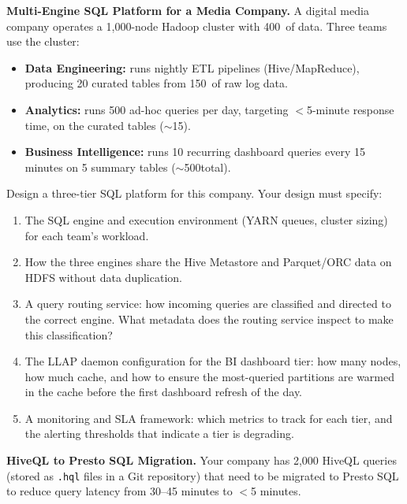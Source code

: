\bigskip
{}

\dpr \textbf{Multi-Engine SQL Platform for a Media Company.}
A digital media company operates a 1{,}000-node Hadoop cluster with
400\TB\ of data. Three teams use the cluster:
\begin{itemize}
  \item \textbf{Data Engineering:} runs nightly ETL pipelines (Hive/MapReduce),
        producing 20 curated tables from 150\TB\ of raw log data.
  \item \textbf{Analytics:} runs 500 ad-hoc queries per day, targeting
        $<$5-minute response time, on the curated tables ($\sim$15\TB).
  \item \textbf{Business Intelligence:} runs 10 recurring dashboard queries
        every 15 minutes on 5 summary tables ($\sim$500\GB total).
\end{itemize}

Design a three-tier SQL platform for this company. Your design must specify:
\begin{enumerate}[label=(\alph*)]
  \item The SQL engine and execution environment (YARN queues, cluster
        sizing) for each team's workload.
  \item How the three engines share the Hive Metastore and Parquet/ORC
        data on HDFS without data duplication.
  \item A query routing service: how incoming queries are classified and
        directed to the correct engine. What metadata does the routing
        service inspect to make this classification?
  \item The LLAP daemon configuration for the BI dashboard tier: how
        many nodes, how much cache, and how to ensure the most-queried
        partitions are warmed in the cache before the first dashboard
        refresh of the day.
  \item A monitoring and SLA framework: which metrics to track for each
        tier, and the alerting thresholds that indicate a tier is degrading.
\end{enumerate}

\dpr \textbf{HiveQL to Presto SQL Migration.}
Your company has 2{,}000 HiveQL queries (stored as \texttt{.hql} files
in a Git repository) that need to be migrated to Presto SQL to reduce
query latency from 30--45 minutes to $<$5 minutes.

